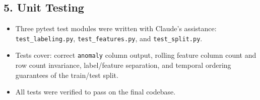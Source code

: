 \documentclass{article}
\begin{document}
\subsection*{5. Unit Testing}
\begin{itemize}
  \item Three pytest test modules were written with Claude's assistance:
        \texttt{test\_labeling.py}, \texttt{test\_features.py}, and
        \texttt{test\_split.py}.
  \item Tests cover: correct \texttt{anomaly} column output, rolling feature
        column count and row count invariance, label/feature separation, and
        temporal ordering guarantees of the train/test split.
  \item All tests were verified to pass on the final codebase.
\end{itemize}

\end{document}
